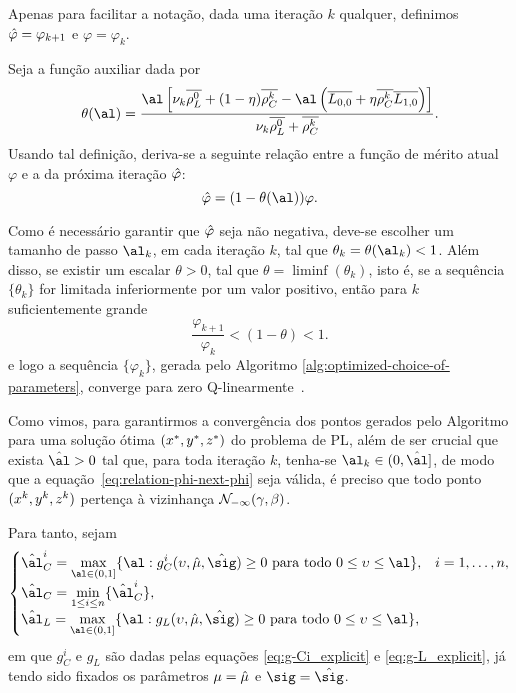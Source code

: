 Apenas para facilitar a notação, dada uma iteração $k$ qualquer, definimos $\hat{\varphi} = \varphi_{k+1}$ e $\varphi = \varphi_{k}$.

Seja a função auxiliar  dada por
\begin{equation}
	\label{eq:theta}
\theta(\al) =  \dfrac{\al\left[ \nuk \dbvec{\rho_L^{0}} + (1-\eta)\rhoCkb  - \al\left(\dbvec{L_{0,0}} + \eta\rhoCkb  \dbvec{L_{1,0}}
\right) \right]}{\nuk \dbvec{\rho_L^{0}} +
\rhoCkb }.
\end{equation}
Usando tal definição, deriva-se a seguinte relação entre a função de mérito atual  $\varphi$  e a da próxima iteração  $\hat{\varphi}$: 
\begin{equation}
	\label{eq:relation-phi-next-phi}
	 			{\nextphi} = (1- \theta(\al))\varphi.
\end{equation}


Como é necessário garantir que  $\hat{\varphi}  $  seja não negativa, deve-se escolher um tamanho de passo  $\al_k$, em cada iteração $k$, tal que  $\theta_k = \theta(\al_k)<1$. Além disso, se existir um escalar $\theta>0$, tal que $\theta = \liminf (\theta_k)$, isto é, se a sequência $\{\theta_k\}$ for limitada inferiormente por um valor positivo,	 então para $k$ suficientemente grande
\[
\frac{{\varphi_{k+1}}}{\varphi_{k}} < (1- \theta) < 1.
\]
e logo a sequência $\{\varphi_k\}$, gerada pelo Algoritmo \ref{alg:optimized-choice-of-parameters}, converge para zero Q-linearmente~\cite{Ortega:2000vd}.




Como vimos, para garantirmos a convergência dos pontos gerados pelo Algoritmo para uma solução ótima $(x^*,y^*,z^*)$ do problema de \ac{PL}, além de ser  crucial que exista $\hat{\al}>0$  tal que,  para toda iteração $k$, tenha-se  $\al_k\in(0,\hat{\al}]$, de modo que a equação~\eqref{eq:relation-phi-next-phi} seja válida, é preciso que todo   ponto  $(x^{k} ,y^{k},z^{k})$ pertença à vizinhança $\mathcal{N}_{-\infty}(\gamma,\beta)$.

Para tanto, sejam  
\begin{equation}
	\label{eq:al-C+al-L}
\begin{cases}
	\hat{\al}_{C}^{i} = \displaystyle \max_{\al\in (0,1]} \{ \al : g_{C}^{i}(\upsilon,\nextmu,\nextsig)\geq0 \text{ para todo } 0 \leq \upsilon\leq \al  \}, & i = 1,\ldots,n,\\
	\hat{\al}_{C} = \displaystyle \min_{1\leq i \leq n} \{\hat{\al}_{C}^{i}\}, \\
	\hat{\al}_{L} = \displaystyle \max_{\al\in (0,1]} \{ \al : g_{L}(\upsilon,\nextmu,\nextsig)\geq0 \text{ para todo } 0 \leq  \upsilon\leq \al  \},
\end{cases}
\end{equation}
em que $g_{C}^{i}$ e $g_{L}$ são dadas pelas equações  \eqref{eq:g-Ci_explicit} e \eqref{eq:g-L_explicit}, já tendo sido fixados os parâmetros $\mu=\hat{\mu}$ e $\sig=\nextsig$.


